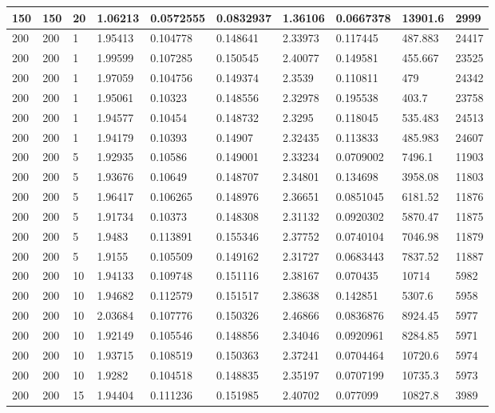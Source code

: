 \begin{landscape}
\begin{longtable}{ | l | l | l | l | l | l | l | l | l | l | }
150 & 150 & 20 & 1.06213 & 0.0572555 & 0.0832937 & 1.36106 & 0.0667378 & 13901.6 & 2999\\ \hline
200 & 200 & 1 & 1.95413 & 0.104778 & 0.148641 & 2.33973 & 0.117445 & 487.883 & 24417\\ \hline
200 & 200 & 1 & 1.99599 & 0.107285 & 0.150545 & 2.40077 & 0.149581 & 455.667 & 23525\\ \hline
200 & 200 & 1 & 1.97059 & 0.104756 & 0.149374 & 2.3539 & 0.110811 & 479 & 24342\\ \hline
200 & 200 & 1 & 1.95061 & 0.10323 & 0.148556 & 2.32978 & 0.195538 & 403.7 & 23758\\ \hline
200 & 200 & 1 & 1.94577 & 0.10454 & 0.148732 & 2.3295 & 0.118045 & 535.483 & 24513\\ \hline
200 & 200 & 1 & 1.94179 & 0.10393 & 0.14907 & 2.32435 & 0.113833 & 485.983 & 24607\\ \hline
200 & 200 & 5 & 1.92935 & 0.10586 & 0.149001 & 2.33234 & 0.0709002 & 7496.1 & 11903\\ \hline
200 & 200 & 5 & 1.93676 & 0.10649 & 0.148707 & 2.34801 & 0.134698 & 3958.08 & 11803\\ \hline
200 & 200 & 5 & 1.96417 & 0.106265 & 0.148976 & 2.36651 & 0.0851045 & 6181.52 & 11876\\ \hline
200 & 200 & 5 & 1.91734 & 0.10373 & 0.148308 & 2.31132 & 0.0920302 & 5870.47 & 11875\\ \hline
200 & 200 & 5 & 1.9483 & 0.113891 & 0.155346 & 2.37752 & 0.0740104 & 7046.98 & 11879\\ \hline
200 & 200 & 5 & 1.9155 & 0.105509 & 0.149162 & 2.31727 & 0.0683443 & 7837.52 & 11887\\ \hline
200 & 200 & 10 & 1.94133 & 0.109748 & 0.151116 & 2.38167 & 0.070435 & 10714 & 5982\\ \hline
200 & 200 & 10 & 1.94682 & 0.112579 & 0.151517 & 2.38638 & 0.142851 & 5307.6 & 5958\\ \hline
200 & 200 & 10 & 2.03684 & 0.107776 & 0.150326 & 2.46866 & 0.0836876 & 8924.45 & 5977\\ \hline
200 & 200 & 10 & 1.92149 & 0.105546 & 0.148856 & 2.34046 & 0.0920961 & 8284.85 & 5971\\ \hline
200 & 200 & 10 & 1.93715 & 0.108519 & 0.150363 & 2.37241 & 0.0704464 & 10720.6 & 5974\\ \hline
200 & 200 & 10 & 1.9282 & 0.104518 & 0.148835 & 2.35197 & 0.0707199 & 10735.3 & 5973\\ \hline
200 & 200 & 15 & 1.94404 & 0.111236 & 0.151985 & 2.40702 & 0.077099 & 10827.8 & 3989\\ \hline

\end{longtable}
\end{landscape}
